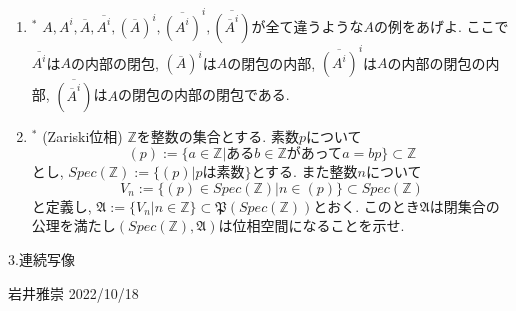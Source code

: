 \documentclass[dvipdfmx,a4paper,11pt]{article}
\newcommand{\Z}{\mathbb{Z}}
\theoremstyle{definition}
\begin{document}
\begin{enumerate}[ label=\textbf{問}2.\arabic*]
\item  $^{*}$ $A,A^{i},\overline{A}, \overline{A^i}, {(\overline{A})}^i, {\overline{(A^i)}}^i, \overline{({\overline{A}}^i)}$が全て違うような$A$の例をあげよ.
ここで$\overline{A^i}$は$A$の内部の閉包, 
${(\overline{A})}^i$は$A$の閉包の内部, ${\overline{(A^i)}}^i$は$A$の内部の閉包の内部, $\overline{({\overline{A}}^i)}$は$A$の閉包の内部の閉包である.
\item $^{*}$ (Zariski位相)
$\Z$を整数の集合とする. 素数$p$について
$$(p) := \{ a \in \Z | \text{ある$b \in \Z$があって$a =bp$}\} \subset \Z$$
とし, $Spec(\Z) := \{(p) | \text{$p$は素数} \}$とする.
また整数$n$について
$$
V_{n} := \{ (p) \in Spec(\Z) | n\in (p)\} \subset Spec(\Z) 
$$
と定義し, $\mathfrak{A} := \{V_{n} | n \in \Z \} \subset \mathfrak{P}(Spec(\Z) ) $とおく.
このとき$\mathfrak{A}$は閉集合の公理を満たし$(Spec(\Z), \mathfrak{A})$は位相空間になることを示せ.


 \end{enumerate}
 
\newpage



\begin{center}
{\Large 3.連続写像}
\end{center}

\begin{flushright}
 岩井雅崇 2022/10/18
\end{flushright}
\end{document}
